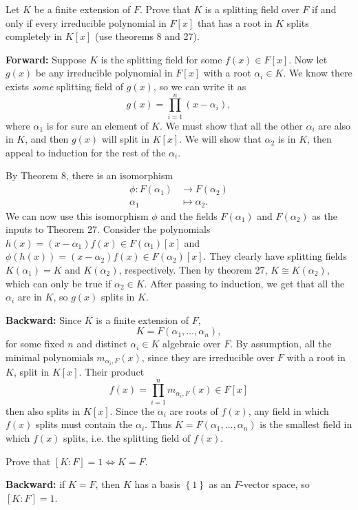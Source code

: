 \documentclass[10pt]{report}
\begin{document}
\begin{exer}[DF 13.4: 5]
	Let $K$ be a finite extension of $F$. Prove that $K$ is a splitting field over $F$ if and only if every irreducible polynomial in $F[x]$ that has a root in $K$ splits completely in $K[x]$ (use theorems 8 and 27).
\end{exer}
\textbf{Forward:} Suppose $K$ is the splitting field for some $f(x) \in F[x]$. Now let $g(x)$ be any irreducible polynomial in $F[x]$ with a root $\alpha_i \in K$. We know there exists \textit{some} splitting field of $g(x)$, so we can write it as
\[
	g(x) = \prod_{i=1}^n (x-\alpha_i),
\] where $\alpha_1$ is for sure an element of $K $. We must show that all the other $\alpha_i$ are also in $K$, and then $g(x)$ will split in $K[x]$. We will show that $\alpha_2$ is in $K$, then appeal to induction for the rest of the $\alpha_i$.

By Theorem 8, there is an isomorphism
\begin{align*}
	\phi:F(\alpha_1) &\to F(\alpha_2) \\
	\alpha_1&\mapsto \alpha_2.
\end{align*}
We can now use this isomorphism $\phi$ and the fields $F(\alpha_1)$ and $F(\alpha_2)$ as the inputs to Theorem 27. Consider the polynomials $h(x)=(x-\alpha_1)f(x) \in F(\alpha_1)[x]$ and $\phi(h(x)) = (x-\alpha_2)f(x)\in F(\alpha_2)[x]$. They clearly have splitting fields $K(\alpha_1)=K$ and $K(\alpha_2)$, respectively. Then by theorem 27, $K \cong K(\alpha_2)$, which can only be true if $\alpha_2 \in K$. After passing to induction, we get that all the $\alpha_i$ are in $K$, so $g(x)$ splits in $K$.

\textbf{Backward:} Since $K$ is a finite extension of $F$, 
\[
	K = F(\alpha_1, \dots, \alpha_n),
\] for some fixed $n$ and distinct $\alpha_i \in K$ algebraic over $F$. By assumption, all the minimal polynomials $m_{\alpha_i,F}(x)$, since they are irreducible over $F$ with a root in $K$, split in $K[x]$. Their product
\[
	f(x) = \prod_{i=1}^n m_{\alpha_i,F}(x) \in F[x]
\] then also splits in $K[x]$. Since the $\alpha_i$ are roots of $f(x)$, any field in which $f(x)$ splits must contain the $\alpha_i$. Thus $K = F(\alpha_1, \dots, \alpha_n)$ is the smallest field in which $f(x)$ splits, i.e. the splitting field of $f(x)$.

\begin{exer}[]
	Prove that $[K:F]=1 \iff K=F$.
\end{exer}
\textbf{Backward:} if $K=F$, then $K$ has a basis $\left\{ 1 \right\}$ as an $F$-vector space, so $[K:F]=1$.
\end{document}
